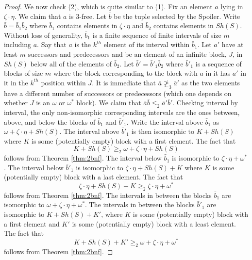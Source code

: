 \documentclass[11pt]{amsart}
\theoremstyle{definition}
\begin{document}
\begin{proof}
    We now check (2), which is quite similar to (1).
    Fix an element $a$ lying in $\zeta\cdot\eta$.
    We claim that $a$ is $3$-free.
    Let $\bar{b}$ be the tuple selected by the Spoiler.
    Write $\bar{b}=\bar{b}_1\bar{b}_2$ where $\bar{b}_1$ contains elements in $\zeta\cdot\eta$ and $\bar{b}_2$ contains elements in $Sh(S)$.
    Without loss of generality, $\bar{b}_1$ is a finite sequence of finite intervals of size $m$ including $a$.
    Say that $a$ is the $k^{th}$ element of its interval within $\bar{b}_1$.
    Let $a'$ have at least $m$ successors and predecessors and be an element of an infinite block, $J$, in $Sh(S)$ below all of the elements of $\bar{b}_2$.
    Let $\bar{b}'=\bar{b}'_1\bar{b}_2$ where $\bar{b}'_1$ is a sequence of blocks of size $m$ where the block corresponding to the block with $a$ in it has $a'$ in it in the $k^{th}$ position within $J$.
    It is immediate that $\bar{a}\not\geq_3\bar{a}'$ as the two elements have a different number of successors or predecessors (which one depends on whether $J$ is an $\omega$ or $\omega^*$ block). 
    We claim that $\bar{a}\bar{b}\leq_2\bar{a}'\bar{b}'$.
    Checking interval by interval, the only non-isomorphic corresponding intervals are the ones between, above, and below the blocks of $\bar{b}_1$ and $\bar{b}'_1$.
    Write the interval above $\bar{b}_1$ as $\omega+\zeta\cdot\eta+Sh(S)$.
    The interval above $\bar{b}'_1$ is then isomorphic to $K+Sh(S)$ where $K$ is some (potentially empty) block with a first element.
    The fact that
    \[K+Sh(S) \geq_2 \omega+\zeta\cdot\eta+Sh(S)\]
    follows from Theorem \ref{thm:2bnf}.
    The interval below $\bar{b}_1$ is isomorphic to $\zeta\cdot\eta+\omega^*$.
    The interval below $\bar{b}'_1$ is isomorphic to $\zeta\cdot\eta+Sh(S)+K$ where $K$ is some (potentially empty) block with a last element.
    The fact that
    \[\zeta\cdot\eta+Sh(S)+K \geq_2\zeta\cdot\eta+\omega^*\]
    follows from Theorem \ref{thm:2bnf}.
    The intervals in between the blocks $\bar{b}_1$ are isomorphic to $\omega+\zeta\cdot\eta+\omega^*$.
    The intervals in between the blocks $\bar{b}'_1$ are isomorphic to $K+Sh(S)+K'$, where $K$ is some (potentially empty) block with a first element and $K'$ is some (potentially empty) block with a least element.
    The fact that 
    \[K+Sh(S)+K' \geq_2\omega+\zeta\cdot\eta+\omega^*\]
    follows from Theorem \ref{thm:2bnf}.


\end{proof}
\end{document}
